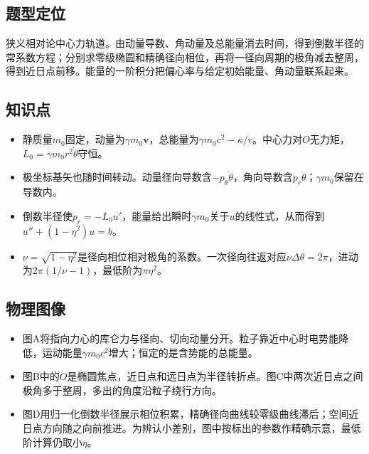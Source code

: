 \documentclass[UTF8,fontset=fandol,a4paper,11pt]{ctexart}
\begin{document}


\subsection*{题型定位}

狭义相对论中心力轨道。由动量导数、角动量及总能量消去时间，得到倒数半径的常系数方程；分别求零级椭圆和精确径向相位，再将一径向周期的极角减去整周，得到近日点前移。能量的一阶积分把偏心率与给定初始能量、角动量联系起来。



\subsection*{知识点}

\begin{itemize}
\item 静质量$m_0$固定，动量为$\gamma m_0\boldsymbol v$，总能量为$\gamma m_0c^2-\kappa/r$。中心力对$O$无力矩，$L_0=\gamma m_0r^2\dot\theta$守恒。
\item 极坐标基矢也随时间转动。动量径向导数含$-p_\theta\dot\theta$，角向导数含$p_r\dot\theta$；$\gamma m_0$保留在导数内。
\item 倒数半径使$p_r=-L_0u'$，能量给出瞬时$\gamma m_0$关于$u$的线性式，从而得到$u''+(1-\eta^2)u=b$。
\item $\nu=\sqrt{1-\eta^2}$是径向相位相对极角的系数。一次径向往返对应$\nu\Delta\theta=2\pi$，进动为$2\pi(1/\nu-1)$，最低阶为$\pi\eta^2$。
\end{itemize}



\subsection*{物理图像}

\begin{itemize}
\item 图A将指向力心的库仑力与径向、切向动量分开。粒子靠近中心时电势能降低，运动能量$\gamma m_0c^2$增大；恒定的是含势能的总能量。
\item 图B中的$O$是椭圆焦点，近日点和远日点为半径转折点。图C中两次近日点之间极角多于整周，多出的角度沿粒子绕行方向。
\item 图D用归一化倒数半径展示相位积累，精确径向曲线较零级曲线滞后；空间近日点方向随之向前推进。为辨认小差别，图中按标出的参数作精确示意，最低阶计算仍取小$\eta$。
\end{itemize}
\end{document}
